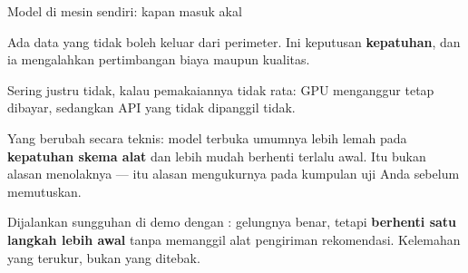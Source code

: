 \documentclass[aspectratio=169,11pt,t]{beamer}
\begin{document}
\begin{frame}[shrink=25]{Model di mesin sendiri: kapan masuk akal}
\begin{minipage}[t]{0.494\textwidth}
\begin{icardaccent}
Ada data yang tidak boleh keluar dari perimeter. Ini keputusan \textbf{kepatuhan}, dan ia mengalahkan pertimbangan biaya maupun kualitas.
\end{icardaccent}
\end{minipage}%
\hfill
\begin{minipage}[t]{0.494\textwidth}
\begin{icardbad}
Sering justru tidak, kalau pemakaiannya tidak rata: GPU menganggur tetap dibayar, sedangkan API yang tidak dipanggil tidak.
\end{icardbad}
\end{minipage}%
{\fontsize{9.4}{12.6}\selectfont\color{fg2}Yang berubah secara teknis: model terbuka umumnya lebih lemah pada \textbf{kepatuhan skema alat} dan lebih mudah berhenti terlalu awal. Itu bukan alasan menolaknya --- itu alasan mengukurnya pada kumpulan uji Anda sebelum memutuskan.\par}\vskip 4pt
\begin{iband}[signal]
Dijalankan sungguhan di demo dengan : gelungnya benar, tetapi \textbf{berhenti satu langkah lebih awal} tanpa memanggil alat pengiriman rekomendasi. Kelemahan yang terukur, bukan yang ditebak.
\end{iband}
\end{frame}
\end{document}

